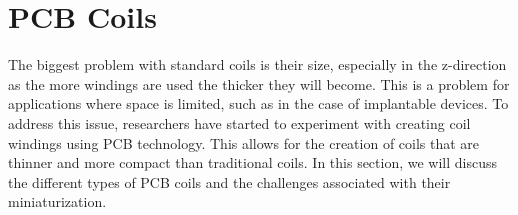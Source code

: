 \section{PCB Coils}
The biggest problem with standard coils is their size, especially in the z-direction as the more windings are used the thicker they will become. This is a problem for applications where space is limited, such as in the case of implantable devices. To address this issue, researchers have started to experiment with creating coil windings using PCB technology. This allows for the creation of coils that are thinner and more compact than traditional coils. In this section, we will discuss the different types of PCB coils and the challenges associated with their miniaturization.







